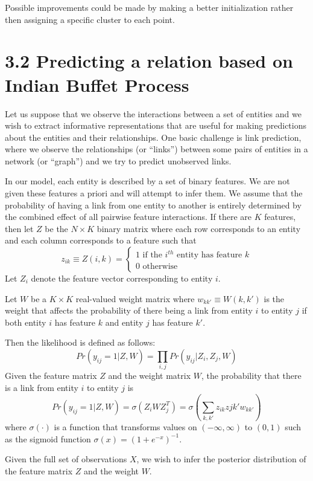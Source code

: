 \documentclass[]{article}
\begin{document}
	
	Possible improvements could be made by making a better initialization rather then assigning a specific cluster to each point.
	
	\newpage
	
	
	\section*{3.2 Predicting a relation based on Indian Buffet Process}
	Let us suppose that we observe the interactions between a set of entities and we wish to extract informative representations that are useful for making predictions about the entities and their relationships. One basic challenge is link prediction, where we observe the relationships (or “links”) between some pairs of entities in a network (or “graph”) and we try to predict unobserved links. 
	
	In our model, each entity is described by a set of binary features. We are not given these features a priori and will attempt to infer them. We assume that the probability of having a link from one entity to another is entirely determined by the combined effect of all pairwise feature interactions. If there are $K$ features, then let $Z$ be the $N \times K$ binary matrix where each row corresponds to an entity and each column corresponds to a feature such that
	$$ 
	z_{ik} \equiv Z(i,k) = 
	\begin{cases}
	1 \text{\ \ \ if the $i^{th}$ entity has feature $k$} \\
	0 \text{\ \ \ otherwise}
	\end{cases}
	$$
	Let $Z_i$ denote the feature vector corresponding to entity $i$.
	
	Let $W$ be a $K \times K$ real-valued weight matrix where $w_{kk'} \equiv W(k, k')$ is the weight that affects the probability of there being a link from entity $i$ to entity $j$ if both entity $i$ has feature $k$ and entity $j$ has feature $k'$.
	
	Then the likelihood is defined as follows:
	$$
	Pr(y_{ij}=1|Z,W) = \prod_{i,j}Pr(y_{ij}|Z_i,Z_j,W)
	$$
	Given the feature matrix $Z$ and the weight matrix $W$, the probability that there is a link from entity $i$ to entity $j$ is
	$$
	Pr(y_{ij}=1|Z,W) = \sigma(Z_iWZ_j^T) = \sigma(\sum_{k,k'}z_{ik}z{jk'}w_{kk'}) 
	$$
	where $\sigma(\cdot)$ is a function that transforms values on $(-\infty, \infty)$ to $(0,1)$ such as the sigmoid function $\sigma(x) = (1+e^{-x})^{-1}$.
	
	Given the full set of observations $X$, we wish to infer the posterior distribution of the feature matrix $Z$ and the weight $W$.
	
\end{document}
